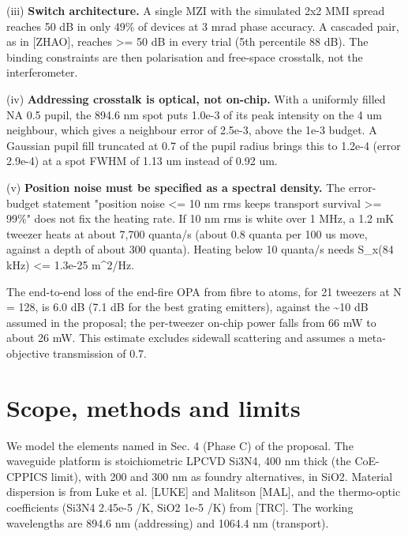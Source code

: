 (iii) \textbf{Switch architecture.} A single MZI with the simulated 2x2
MMI spread reaches 50 dB in only 49\% of devices at 3 mrad phase
accuracy. A cascaded pair, as in {[}ZHAO{]}, reaches \textgreater= 50 dB
in every trial (5th percentile 88 dB). The binding constraints are then
polarisation and free-space crosstalk, not the interferometer.

(iv) \textbf{Addressing crosstalk is optical, not on-chip.} With a
uniformly filled NA 0.5 pupil, the 894.6 nm spot puts 1.0e-3 of its peak
intensity on the 4 um neighbour, which gives a neighbour error of
2.5e-3, above the 1e-3 budget. A Gaussian pupil fill truncated at 0.7 of
the pupil radius brings this to 1.2e-4 (error 2.9e-4) at a spot FWHM of
1.13 um instead of 0.92 um.

(v) \textbf{Position noise must be specified as a spectral density.} The
error-budget statement "position noise \textless= 10 nm rms keeps
transport survival \textgreater= 99\%" does not fix the heating rate. If
10 nm rms is white over 1 MHz, a 1.2 mK tweezer heats at about 7,700
quanta/s (about 0.8 quanta per 100 us move, against a depth of about 300
quanta). Heating below 10 quanta/s needs S\_x(84 kHz) \textless= 1.3e-25
m\^{}2/Hz.

The end-to-end loss of the end-fire OPA from fibre to atoms, for 21
tweezers at N = 128, is 6.0 dB (7.1 dB for the best grating emitters),
against the \textasciitilde10 dB assumed in the proposal; the
per-tweezer on-chip power falls from 66 mW to about 26 mW. This estimate
excludes sidewall scattering and assumes a meta-objective transmission
of 0.7.

\hypertarget{2-scope-methods-and-limits}{%
\section{Scope, methods and
limits}\label{findings-2-scope-methods-and-limits}}

We model the elements named in Sec. 4 (Phase C) of the proposal. The
waveguide platform is stoichiometric LPCVD Si3N4, 400 nm thick (the
CoE-CPPICS limit), with 200 and 300 nm as foundry alternatives, in SiO2.
Material dispersion is from Luke et al. {[}LUKE{]} and Malitson
{[}MAL{]}, and the thermo-optic coefficients (Si3N4 2.45e-5 /K, SiO2
1e-5 /K) from {[}TRC{]}. The working wavelengths are 894.6 nm
(addressing) and 1064.4 nm (transport).

